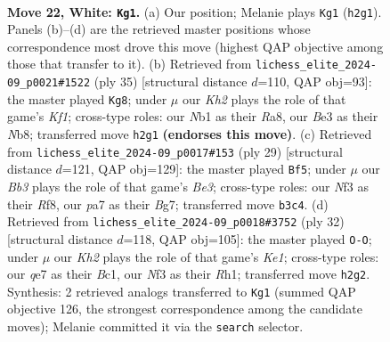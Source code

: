 \documentclass[11pt]{article}
\begin{document}
\begin{figure}[p]
\label{fig:thought-m40}
\end{figure}

\clearpage

\begin{figure}[p]\centering
\begin{subfigure}{0.46\textwidth}\centering
\resizebox{\linewidth}{!}{%
\newchessgame
\chessboard[
  setfen={rnbr2k1/pp2qpb1/4pnp1/1Q1p3p/P2P3P/1B2BNP1/RPP2P1K/1N2R3 w - - 7 22},
  showmover=false,
  pgfstyle=straightmove, color=movearrow, markmove={h2-g1}
]}
\caption{}
\end{subfigure}\hfill
\begin{subfigure}{0.46\textwidth}\centering
\resizebox{\linewidth}{!}{%
\newchessgame
\chessboard[
  setfen={rn3k1r/1p1q1pb1/p2p1nbp/2pP4/P1P2B2/2N1R1P1/1P1QP1BP/5RK1 b - - 4 18},
  showmover=false,
  pgfstyle=straightmove, color=movearrow, markmove={f8-g8}
]}
\caption{}
\end{subfigure}
\\[4pt]
\begin{subfigure}{0.46\textwidth}\centering
\resizebox{\linewidth}{!}{%
\newchessgame
\chessboard[
  setfen={r4rk1/1p2ppb1/pqp1bnpp/8/1PPPp2P/4P1B1/P1QNBPP1/1R2K2R b K - 1 15},
  showmover=false,
  pgfstyle=straightmove, color=movearrow, markmove={e6-f5}
]}
\caption{}
\end{subfigure}\hfill
\begin{subfigure}{0.46\textwidth}\centering
\resizebox{\linewidth}{!}{%
\newchessgame
\chessboard[
  setfen={1rb1k2r/p2pb1pp/1q2p3/2p1Pp2/2Pn1P2/P2B3Q/1P3NPP/1RB1K2R w Kk - 7 17},
  showmover=false,
  pgfstyle=straightmove, color=movearrow, markmove={e1-g1}
]}
\caption{}
\end{subfigure}
\caption{\textbf{Move 22, White: \texttt{Kg1}.} (a) Our position; Melanie plays \texttt{Kg1} (\texttt{h2g1}). Panels (b)--(d) are the retrieved master positions whose correspondence most drove this move (highest QAP objective among those that transfer to it). (b) Retrieved from \texttt{lichess\_elite\_2024-09\_p0021\#1522} (ply 35) [structural distance $d$=110, QAP obj=93]: the master played \texttt{Kg8}; under $\mu$ our \emph{Kh2} plays the role of that game's \emph{Kf1}; cross-type roles: our \emph{N}b1 as their \emph{R}a8, our \emph{B}e3 as their \emph{N}b8; transferred move \texttt{h2g1} \textbf{(endorses this move)}. (c) Retrieved from \texttt{lichess\_elite\_2024-09\_p0017\#153} (ply 29) [structural distance $d$=121, QAP obj=129]: the master played \texttt{Bf5}; under $\mu$ our \emph{Bb3} plays the role of that game's \emph{Be3}; cross-type roles: our \emph{N}f3 as their \emph{R}f8, our \emph{p}a7 as their \emph{B}g7; transferred move \texttt{b3c4}. (d) Retrieved from \texttt{lichess\_elite\_2024-09\_p0018\#3752} (ply 32) [structural distance $d$=118, QAP obj=105]: the master played \texttt{O-O}; under $\mu$ our \emph{Kh2} plays the role of that game's \emph{Ke1}; cross-type roles: our \emph{q}e7 as their \emph{B}c1, our \emph{N}f3 as their \emph{R}h1; transferred move \texttt{h2g2}. Synthesis: 2 retrieved analogs transferred to \texttt{Kg1} (summed QAP objective 126, the strongest correspondence among the candidate moves); Melanie committed it via the \texttt{search} selector.}

\end{figure}
\end{document}
